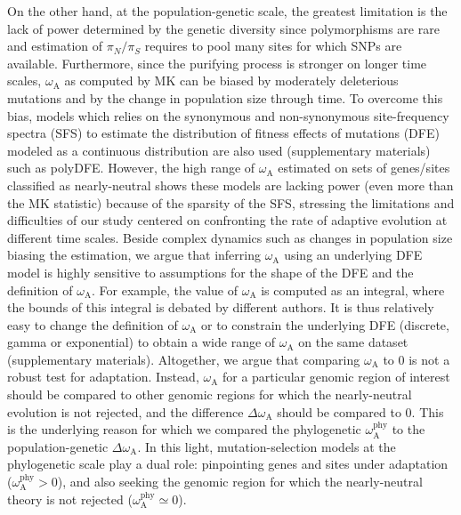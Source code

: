 \documentclass{article}
\newcommand{\rateApop}{\omega_{\mathrm{A}}}
\newcommand{\rateAphy}{\rateApop^{\mathrm{phy}}}
\newcommand{\pn}{\pi_N}
\newcommand{\ps}{\pi_S}
\newcommand{\pnps}{\pn / \ps}
\begin{document}
    On the other hand, at the population-genetic scale, the greatest limitation is the lack of power determined by the genetic diversity since polymorphisms are rare and estimation of $\pnps$ requires to pool many sites for which SNPs are available.
    Furthermore, since the purifying process is stronger on longer time scales, $\rateApop$ as computed by MK can be biased by moderately deleterious mutations\cite{eyre-walker_quantifying_2002, ho_time_2005} and by the change in population size through time\cite{eyre-walker_changing_2002}.
    To overcome this bias, models which relies on the synonymous and non-synonymous site-frequency spectra (SFS) to estimate the distribution of fitness effects of mutations (DFE) modeled as a continuous distribution are also used (supplementary materials) such as polyDFE\cite{tataru_polydfe_2020}.
    However, the high range of $\rateApop$ estimated on sets of genes/sites classified as nearly-neutral shows these models are lacking power (even more than the MK statistic) because of the sparsity of the SFS, stressing the limitations and difficulties of our study centered on confronting the rate of adaptive evolution at different time scales.
    Beside complex dynamics such as changes in population size biasing the estimation\cite{rousselle_overestimation_2018}, we argue that inferring $\rateApop$ using an underlying DFE model is highly sensitive to assumptions for the shape of the DFE and the definition of $\rateApop$.
    For example, the value of $\rateApop$ is computed as an integral, where the bounds of this integral is debated by different authors\cite{galtier_adaptive_2016, tataru_polydfev2_2019}.
    It is thus relatively easy to change the definition of $\rateApop$ or to constrain the underlying DFE (discrete, gamma or exponential) to obtain a wide range of $\rateApop$ on the same dataset (supplementary materials).
    Altogether, we argue that comparing $\rateApop$ to 0 is not a robust test for adaptation.
    Instead, $\rateApop$ for a particular genomic region of interest should be compared to other genomic regions for which the nearly-neutral evolution is not rejected, and the difference $\Delta \rateApop$ should be compared to 0.
    This is the underlying reason for which we compared the phylogenetic $\rateAphy$ to the population-genetic $\Delta \rateApop$.
    In this light, mutation-selection models at the phylogenetic scale play a dual role: pinpointing genes and sites under adaptation ($\rateAphy > 0$), and also seeking the genomic region for which the nearly-neutral theory is not rejected ($\rateAphy \simeq 0$).
\end{document}
